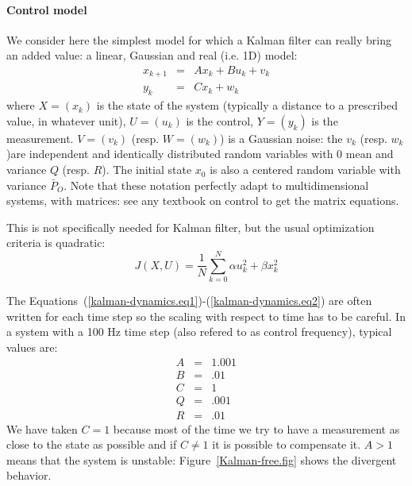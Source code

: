 

\paragraph{Control model}

We consider here the simplest model for which a Kalman filter can really bring an added value: a linear, Gaussian and real (i.e. 1D) model:
\begin{eqnarray}
\label{kalman-dynamics.eq1}
x_{k+1} &=& A x_k + B u_k + v_k\\
\label{kalman-dynamics.eq2}
y_k &=& C x_k + w_k
\end{eqnarray}
where $X=(x_k)$ is the state of the system (typically a distance to a prescribed value, in whatever unit), $U=(u_k)$ is the control, $Y=(y_k)$ is the measurement. $V=(v_k)$ (resp. $W=(w_k)$) is a Gaussian noise: the $v_k$ (resp. $w_k$)are independent and identically distributed random variables with 0 mean and variance $Q$ (resp. $R$). The initial state $x_0$ is also a centered random variable with variance $\bar{P}_O$. Note that these notation perfectly adapt to multidimensional systems, with matrices: see any textbook on control to get the matrix equations.

This is not specifically needed for Kalman filter, but the usual optimization criteria is quadratic:
\begin{equation}\label{kalman-cost.eq1}
	J(X,U) = \frac{1}{N}\sum_{k=0}^N \alpha u_k^2 + \beta x_k^2
\end{equation}

The Equations~(\ref{kalman-dynamics.eq1})-(\ref{kalman-dynamics.eq2}) are often written for each time step so the scaling with respect to time has to be careful. In a system with a 100 Hz time step (also refered to as control frequency), typical values are:
\begin{eqnarray*}
A &=& 1.001\\
B &=& .01\\
C &=& 1\\
Q &=& .001\\
R &=& .01
\end{eqnarray*}
We have taken $C=1$ because most of the time we try to have a measurement as close to the state as possible and if $C\neq 1$ it is possible to compensate it. $A>1$ means that the system is unstable: Figure~\ref{Kalman-free.fig} shows the divergent behavior.

